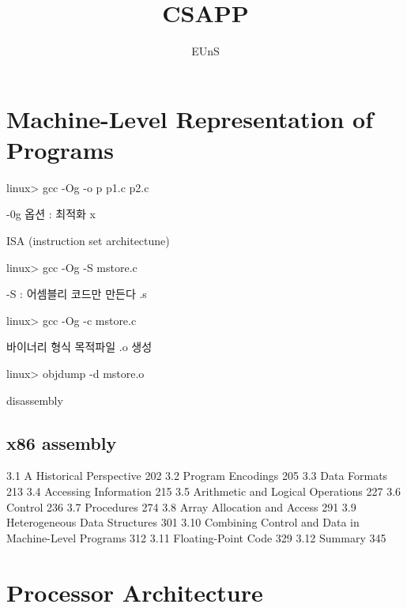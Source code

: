 \documentclass{memoir}
\begin{document}
    
\title{CSAPP}
\author{ EUnS }

\maketitle

\tableofcontents





\chapter{Machine-Level Representation of Programs}


linux> gcc -Og -o p p1.c p2.c


-0g 옵션 : 최적화 x

ISA (instruction set architectune)

linux> gcc -Og -S mstore.c

-S : 어셈블리 코드만 만든다 .s

linux> gcc -Og -c mstore.c

바이너리 형식 목적파일 .o  생성


linux> objdump -d mstore.o

disassembly


\section{x86 assembly}











3.1 A Historical Perspective 202
3.2 Program Encodings 205
3.3 Data Formats 213
3.4 Accessing Information 215
3.5 Arithmetic and Logical Operations 227
3.6 Control 236
3.7 Procedures 274
3.8 Array Allocation and Access 291
3.9 Heterogeneous Data Structures 301
3.10 Combining Control and Data in Machine-Level Programs 312
3.11 Floating-Point Code 329
3.12 Summary 345

\chapter{Processor Architecture}
\end{document}
